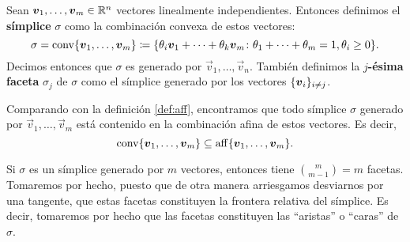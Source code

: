 \begin{definition}
	\label{def:simplex}
	Sean $\boldsymbol{v}_1, \ldots, \boldsymbol{v}_m \in \mathbb{R}^n$ vectores linealmente independientes. Entonces
	definimos el \textbf{símplice} $\sigma$ como la combinación convexa de estos vectores:
	\begin{equation*}
		\sigma = \operatorname{conv}\lbrace \boldsymbol{v}_1, \ldots, \boldsymbol{v}_m \rbrace
		\coloneq
		\lbrace \theta_i\boldsymbol{v}_1 + \cdots + \theta_k\boldsymbol{v}_m
		\colon \theta_1 + \cdots + \theta_m = 1, \theta_i \geq 0 \rbrace.
	\end{equation*}
	Decimos entonces que $\sigma$ es generado por $\vec{v}_1, \ldots, \vec{v}_n$. También definimos
	la \textbf{$j$-ésima faceta} $\sigma_j$ de $\sigma$ como el símplice generado por los vectores
	$\lbrace \boldsymbol{v}_i \rbrace_{i \neq j}$.
\end{definition}
\begin{observation}
	Comparando con la definición \ref{def:aff}, encontramos que todo símplice $\sigma$ generado por
	$\vec{v}_1, \ldots, \vec{v}_m$ está contenido en la combinación afina de estos vectores. Es
	decir,
	\begin{equation}
		\label{aff:contention}
		\operatorname{conv}\lbrace \boldsymbol{v}_1, \ldots, \boldsymbol{v}_m \rbrace \subseteq
		\operatorname{aff}\lbrace \boldsymbol{v}_1, \ldots, \boldsymbol{v}_m \rbrace.
	\end{equation}
\end{observation}
\begin{observation}
	Si $\sigma$ es un símplice generado por $m$ vectores, entonces tiene $\binom{m}{m-1} = m$
	facetas. Tomaremos por hecho, puesto que de otra manera arriesgamos desviarnos por una tangente,
	que estas facetas constituyen la frontera relativa del símplice. Es decir, tomaremos por hecho
	que las facetas constituyen las ``aristas'' o ``caras'' de $\sigma$.
\end{observation}

